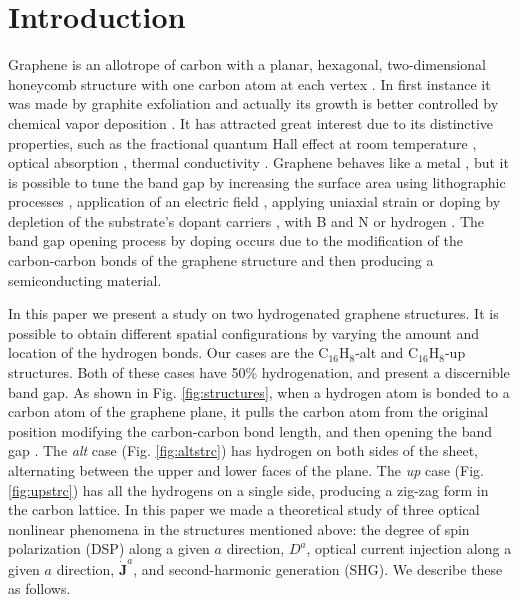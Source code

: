 \documentclass[pss]{wiley2sp} %
\begin{document}
\maketitle


\section{Introduction}\label{sec:intro}

Graphene is an allotrope of carbon with a planar, hexagonal, two-dimensional honeycomb structure with one carbon atom at each vertex \cite{geimNM07}. In first instance it was made by graphite exfoliation \cite{geimNM07} and actually its growth is better controlled by chemical vapor deposition \cite{reinaNL08}. It has attracted great interest due to its distinctive properties, such as the fractional quantum Hall effect at room temperature \cite{bottegoniAPL13}, optical absorption \cite{thongrattanasiriPRL12}, thermal conductivity \cite{balandinNL08}. Graphene behaves like a metal \cite{geimNM07}, but it is possible to tune the band gap by increasing the surface area using lithographic processes \cite{hanPRL07}, application of an electric field \cite{zhangN09}, applying uniaxial strain \cite{niACSN08} or doping by depletion of the substrate's dopant carriers \cite{ohtaS06}, with B and N \cite{guoIJ11} or hydrogen \cite{eliasS09,guisingerNL09,samarakoonACSN10}. The band gap opening process by doping occurs due to the modification of the carbon-carbon bonds of the graphene structure and then producing a semiconducting material.

In this paper we present a study on two hydrogenated graphene structures. It is possible to obtain different spatial configurations by varying the amount and location of the hydrogen bonds. Our cases are the C$_{16}$H$_{8}$-alt and C$_{16}$H$_{8}$-up structures. Both of these cases have 50\% hydrogenation, and present a discernible band gap. As shown in Fig. \ref{fig:structures}, when a hydrogen atom is bonded to a carbon atom of the graphene plane, it pulls the carbon atom from the original position modifying the carbon-carbon bond length, and then opening the band gap \cite{samarakoonACSN10}. The \emph{alt} case (Fig. \ref{fig:altstrc}) has hydrogen on both sides of the sheet, alternating between the upper and lower faces of the plane. The \emph{up} case (Fig. \ref{fig:upstrc}) has all the hydrogens on a single side, producing a zig-zag form in the carbon lattice. In this paper we made a theoretical study of three optical nonlinear phenomena in the structures mentioned above: the degree of spin polarization (DSP) along a given $a$ direction, $D^{a}$, optical current injection along a given $a$ direction, $\mathbf{\dot{J}}^{a}$, and second-harmonic generation (SHG). We describe these as follows.
\end{document}
